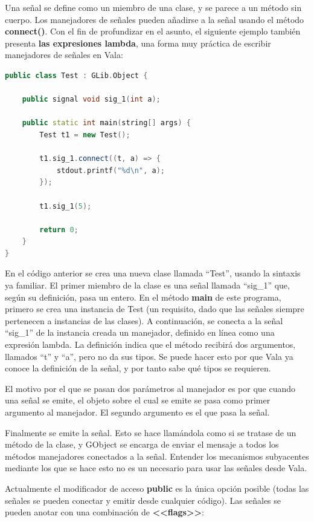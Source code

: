 \documentclass[12pt,twoside]{book}
\begin{document}
Una señal se define como un miembro de una clase, y se parece a un método sin cuerpo. Los manejadores de señales pueden añadirse a la señal usando el método \textbf{connect()}. Con el fin de profundizar en el asunto, el siguiente ejemplo también presenta \textbf{las expresiones lambda}, una forma muy práctica de escribir manejadores de señales en Vala:

\begin{lstlisting}[language=C++]
public class Test : GLib.Object {
	
	public signal void sig_1(int a);
	
	public static int main(string[] args) {
		Test t1 = new Test();
		
		t1.sig_1.connect((t, a) => {
			stdout.printf("%d\n", a);
		});
		
		t1.sig_1(5);
		
		return 0;
	}
}
\end{lstlisting}

En el código anterior se crea una nueva clase llamada ``Test'', usando la sintaxis ya familiar. El primer miembro de la clase es una señal llamada ``sig\_1'' que, según su definición, pasa un entero. En el método \textbf{main} de este programa, primero se crea una instancia de Test (un requisito, dado que las señales siempre pertenecen a instancias de las clases). A continuación, se conecta a la señal ``sig\_1'' de la instancia creada un manejador, definido en línea como una expresión lambda. La definición indica que el método recibirá dos argumentos, llamados ``t'' y ``a'', pero no da sus tipos. Se puede hacer esto por que Vala ya conoce la definición de la señal, y por tanto sabe qué tipos se requieren.

El motivo por el que se pasan dos parámetros al manejador es por que cuando una señal se emite, el objeto sobre el cual se emite se pasa como primer argumento al manejador. El segundo argumento es el que pasa la señal.

Finalmente se emite la señal. Esto se hace llamándola como si se tratase de un método de la clase, y GObject se encarga de enviar el mensaje a todos los métodos manejadores conectados a la señal. Entender los mecanismos subyacentes mediante los que se hace esto no es un necesario para usar las señales desde Vala.

Actualmente el modificador de acceso \textbf{public} es la única opción posible (todas las señales se pueden conectar y emitir desde cualquier código). Las señales se pueden anotar con una combinación de \textbf{<<flags>>}:
\end{document}
